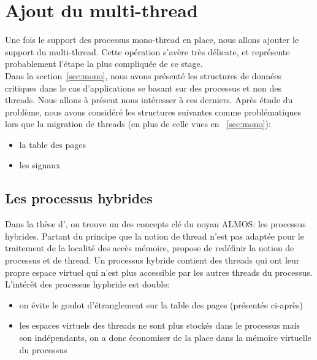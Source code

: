 


  \section{Ajout du multi-thread}
  \label{sec:multi}  

    Une fois le support des processus mono-thread en place, nous allons ajouter
    le support du multi-thread. Cette opération s'avère très délicate, et
    représente probablement l'étape la plus compliquée de ce stage.\\

    Dans la section~\ref{sec:mono}, nous avons présenté les structures de
    données critiques dans le cas d'applications se basant sur des processus et
    non des threads. Nous allons à présent nous intéresser à ces derniers. Après
    étude du problème, nous avons considéré les structures suivantes comme
    problématiques lors que la migration de threads (en plus de celle vues
    en ~\ref{sec:mono}):
    \begin{itemize}
      \item la table des pages
      \item les signaux
    \end{itemize}  

    \subsection{Les processus hybrides}

      Dans la thèse d'\citet{almaless2014universite}, on trouve un des concepts
      clé du noyau ALMOS: les processus hybrides. Partant du principe que la
      notion de thread n'est pas adaptée pour le traitement de la localité des
      accès mémoire,\citeauthor{almaless2014universite} propose de redéfinir la
      notion de processus et de thread. Un processus hybride contient des
      threads qui ont leur propre espace virtuel qui n'est plus accessible par
      les autres threads du processus. L'intérêt des processus hypbride est
      double:
      \begin{itemize}
        \item on évite le goulot d'étranglement sur la table des pages
          (présentée ci-après)
        \item les espaces virtuels des threads ne sont plus stockés dans le
          processus mais son indépendants, on a donc économiser de la place dans
          la mémoire virtuelle du processus
      \end{itemize}

